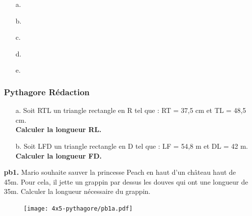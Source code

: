 \begin{multicols}{5}
  \begin{enumerate}
  \item[a.] \dotfill \\ \Pointilles[1]
  \item[b.] \dotfill \\ \Pointilles[1]
  \item[c.] \dotfill \\ \Pointilles[1]
  \item[d.] \dotfill \\ \Pointilles[1]
  \item[e.] \dotfill \\ \Pointilles[1]
  \end{enumerate}
\end{multicols}


\subsubsection*{Pythagore Rédaction}

\begin{multicols}{2}
\begin{enumerate}
  \item[a.]Soit RTL un triangle rectangle en R tel que : RT = 37,5 cm et TL = 48,5 cm. \\
  \textbf{Calculer la longueur RL.}

  \item[b.]Soit LFD un triangle rectangle en D tel que : LF = 54,8 m et DL = 42 m. \\
  \textbf{Calculer la longueur FD.}

\end{enumerate}
\end{multicols}

\Pointilles[13]

\begin{minipage}[t]{0.65\textwidth}
  \textbf{pb1.} Mario souhaite sauver la princesse Peach en haut d'un château haut de 45m. Pour cela, il jette un grappin par dessus les douves qui ont une longueur de 35m. Calculer la longueur nécessaire du grappin.
  
  \Pointilles[5]
  \end{minipage}
  \begin{minipage}[t]{0.35\textwidth}
  \begin{figure}[H]
    \centering
    \texttt{[image: 4x5-pythagore/pb1a.pdf]}
  \end{figure}
\end{minipage}

